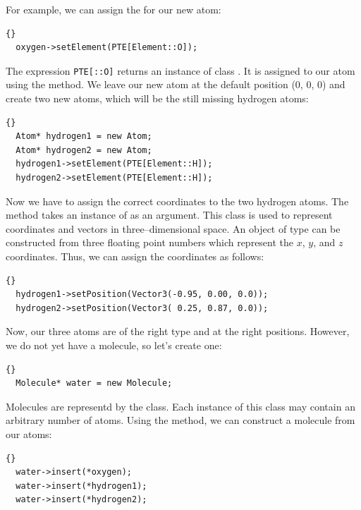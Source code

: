 \noindent
For example, we can assign the  for our new atom:

\begin{lstlisting}{}
  oxygen->setElement(PTE[Element::O]);
\end{lstlisting}

\noindent
The expression {\tt PTE[::O]} returns an instance of class
. It is assigned to our atom using the 
method. We leave our new atom at the default position (0, 0, 0) and create two
new atoms, which will be the still missing hydrogen atoms:

\begin{lstlisting}{}
  Atom* hydrogen1 = new Atom;
  Atom* hydrogen2 = new Atom;
  hydrogen1->setElement(PTE[Element::H]);
  hydrogen2->setElement(PTE[Element::H]);
\end{lstlisting}
	
\noindent
Now we have to assign the correct coordinates to the two hydrogen atoms.  The
method  takes an instance of  as an
argument. This class is used to represent coordinates and vectors in
three--dimensional space. An object of type  can be constructed
from three floating point numbers which represent the $x$, $y$, and $z$
coordinates. Thus, we can assign the coordinates as follows:
 
\begin{lstlisting}{}
  hydrogen1->setPosition(Vector3(-0.95, 0.00, 0.0));
  hydrogen2->setPosition(Vector3( 0.25, 0.87, 0.0));
\end{lstlisting}

\noindent

Now, our three atoms are of the right type and at the right positions. However, we
do not yet have a molecule, so let's create one:\\

\begin{lstlisting}{}
  Molecule* water = new Molecule;
\end{lstlisting}

\noindent
Molecules are representd by the  class. Each instance of this
class may contain an arbitrary number of atoms. Using the 
method, we can construct a molecule from our atoms:

\begin{lstlisting}{}
  water->insert(*oxygen);
  water->insert(*hydrogen1);
  water->insert(*hydrogen2);
\end{lstlisting}

